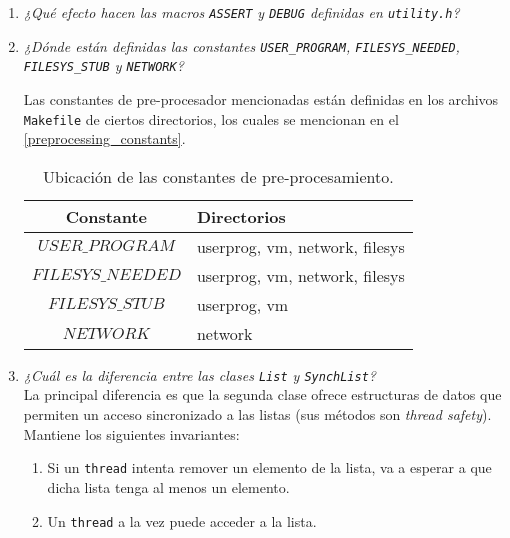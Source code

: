 \begin{enumerate}
\item \textit{¿Qué efecto hacen las macros \texttt{ASSERT} y \texttt{DEBUG} definidas en \texttt{utility.h}?}

\item \textit{¿Dónde están definidas las constantes \texttt{USER\_PROGRAM}, \texttt{FILESYS\_NEEDED}, \texttt{FILESYS\_STUB} y \texttt{NETWORK}?}

Las constantes de pre-procesador mencionadas están definidas en los archivos \texttt{Makefile} de ciertos directorios, los cuales se mencionan en el \autoref{preprocessing_constants}.

\begin{table}[!h]
	\center
    \begin{tabular}{|c|l|}
\hline 
Constante & Directorios\\
\hline
$USER\_PROGRAM$ & userprog, vm, network, filesys \\
$FILESYS\_NEEDED$ & userprog, vm, network, filesys \\
$FILESYS\_STUB$ & userprog, vm \\
$NETWORK$ & network \\
\hline
    \end{tabular}
    \caption{Ubicación de las constantes de pre-procesamiento.}
    \label{preprocessing_constants}
\end{table}


\item \textit{¿Cuál es la diferencia entre las clases \texttt{List} y \texttt{SynchList}?}\\
La principal diferencia es que la segunda clase ofrece estructuras de datos que permiten un acceso sincronizado a las listas (sus métodos son \textit{thread safety}). Mantiene los siguientes invariantes:
\begin{enumerate}
    \item Si un \texttt{thread} intenta remover un elemento de la lista, va a esperar a que dicha lista tenga al menos un elemento.
    \item Un \texttt{thread} a la vez puede acceder a la lista.
\end{enumerate}


\end{enumerate}
